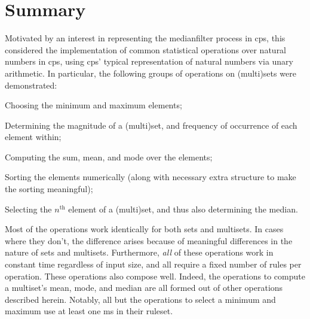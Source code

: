 



\section{Summary}

Motivated by an interest in representing the \gls{medianfilter} process in \gls{cps}, this  considered the implementation of common statistical operations over natural numbers in \gls{cps}, using \gls{cps}' typical representation of natural numbers via unary arithmetic.  In particular, the following groups of operations on (multi)sets were demonstrated:
\begin{inparaenum}[(i)]
\item Choosing the minimum and maximum elements;
\item Determining the magnitude of a (multi)set, and frequency of occurrence of each element within;
\item Computing the sum, mean, and mode over the elements;
\item Sorting the elements numerically (along with necessary extra structure to make the sorting meaningful);
\item Selecting the \(n^\text{th}\) element of a (multi)set, and thus also determining the median.
\end{inparaenum}

Most of the operations work identically for both sets and multisets.  In cases where they don't, the difference arises because of meaningful differences in the nature of sets and multisets.  Furthermore, \emph{all} of these operations work in constant time regardless of input size, and all require a fixed number of rules per operation.  These operations also compose well.  Indeed, the operations to compute a multiset's mean, mode, and median are all formed out of other operations described herein.  Notably, all but the operations to select a minimum and maximum use at least one \gls{ms} in their ruleset.

